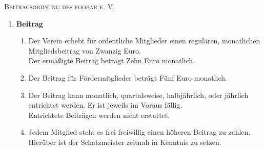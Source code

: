 

\pagestyle{empty}

	\textsc{\huge Beitragsordnung des foobar e. V.}\\[0.5cm]
	\begin{enumerate}[label=\bfseries §\arabic*]
		\item \textbf{Beitrag}
			\begin{enumerate}[label=\bfseries (\arabic*)] 
			  \item Der Verein erhebt für ordentliche Mitglieder einen regulären, monatlichen Mitgliedsbeitrag von Zwanzig Euro.\\ Der ermäßigte Beitrag beträgt Zehn Euro monatlich.
			  \item Der Beitrag für Fördermitglieder beträgt Fünf Euro monatlich.
			  \item Der Beitrag kann monatlich, quartalsweise, halbjährlich, oder jährlich entrichtet werden. Er ist jeweils im Voraus fällig.\\ Entrichtete Beiträgen werden nicht erstattet.
			  \item Jedem Mitglied steht es frei freiwillig einen höheren Beitrag zu zahlen.\\ Hierüber ist der Schatzmeister zeitnah in Kenntnis zu setzen.
			\end{enumerate}
	\end{enumerate}

